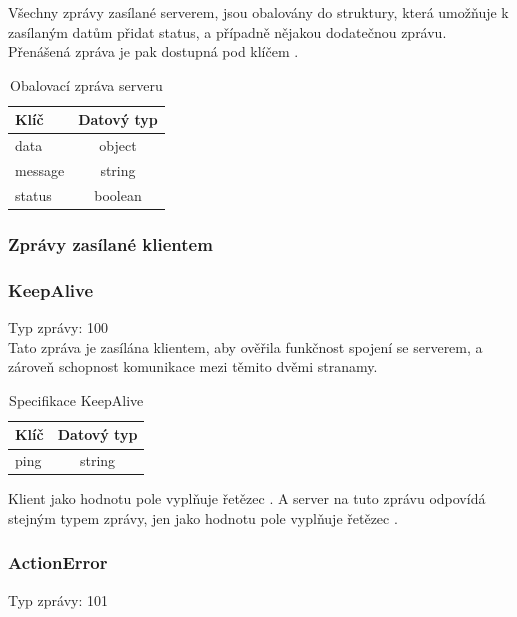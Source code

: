 \documentclass[12pt, a4paper]{article}
\begin{document}
    Všechny zprávy zasílané serverem, jsou obalovány do struktury, která umožňuje k zasílaným datům přidat status, a případně nějakou dodatečnou zprávu. Přenášená zpráva je pak dostupná pod klíčem .

    \begin{table}[H]
        \centering
        \begin{tabular}{|l|c|}
            \hline
            Klíč & Datový typ\\
            \hline
            \hline
            data & object \\
            \hline
            message & string \\
            \hline
            status & boolean \\
            \hline
        \end{tabular}
        \caption{Obalovací zpráva serveru}
    \end{table}

    \subsubsection{Zprávy zasílané klientem}
    \subsubsection*{KeepAlive}
    Typ zprávy: 100\\

    Tato zpráva je zasílána klientem, aby ověřila funkčnost spojení se serverem, a zároveň schopnost komunikace mezi těmito dvěmi stranamy.

    \begin{table}[H]
        \centering
        \begin{tabular}{|l|c|}
            \hline
            Klíč & Datový typ\\
            \hline
            \hline
            ping & string \\
            \hline
        \end{tabular}
        \caption{Specifikace KeepAlive}
    \end{table}

    Klient jako hodnotu pole  vyplňuje řetězec . A server na tuto zprávu odpovídá stejným typem zprávy, jen jako hodnotu pole  vyplňuje řetězec .

    \subsubsection*{ActionError}
    Typ zprávy: 101\\
\end{document}
